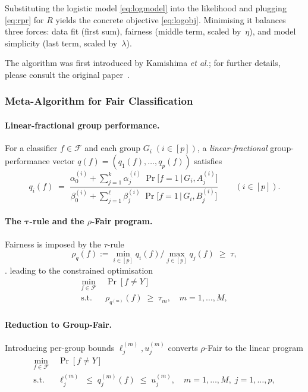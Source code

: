 \documentclass[12pt,a4paper,openright,twoside]{book}
\begin{document}
\noindent
Substituting the logistic model \eqref{eq:logmodel} into the likelihood and plugging \eqref{eq:rpr} for \(R\) yields the concrete objective \eqref{eq:logobj}.  Minimising it balances three forces: data fit (first sum), fairness (middle term, scaled by~\(\eta\)), and model simplicity (last term, scaled by~\(\lambda\)).

The algorithm was first introduced by Kamishima \emph{et al.}; for further details, please consult the original paper~\cite{kamishima2012prejudiceremoverregularizer}.

\subsubsection{Meta-Algorithm for Fair Classification}

\paragraph{Linear-fractional group performance.}
For a classifier $f\!\in\!\mathcal{F}$ and each group $G_i\;(i\!\in\![p])$, a \emph{linear-fractional} group-performance vector $q(f)=(q_1(f),\dots,q_p(f))$ satisfies \cite{celis2020classificationfairnessconstraintsmetaalgorithm}
\[
q_i(f)\;=\;
\frac{\displaystyle 
\alpha^{(i)}_0+\sum_{j=1}^{k}\alpha^{(i)}_j\;
      \Pr\!\bigl[f=1\,\bigl\vert\,G_i,A^{(i)}_{j}\bigr]}
     {\displaystyle
      \beta^{(i)}_0+\sum_{j=1}^{\ell}\beta^{(i)}_j\;
      \Pr\!\bigl[f=1\,\bigl\vert\,G_i,B^{(i)}_{j}\bigr]}
\qquad(i\in[p]).
\]

\paragraph{The $\boldsymbol{\tau}$-rule and the \texorpdfstring{$\rho$}{rho}-Fair program.}
Fairness is imposed by the $\tau$-rule
\[
\rho_q(f):=\min_{i\in[p]}q_i(f)/\max_{j\in[p]}q_j(f)\;\ge\;\tau,
\] \cite{celis2020classificationfairnessconstraintsmetaalgorithm}.
leading to the constrained optimisation
\[
\begin{aligned}
\min_{f\in\mathcal{F}}\;&\Pr[f\neq Y]\\
\text{s.t.}\;&\rho_{q^{(m)}}(f)\;\ge\;\tau_m,\quad m=1,\dots,M,
\end{aligned}
\tag{$\rho$-Fair} %
\]

\paragraph{Reduction to Group-Fair.}
Introducing per-group bounds $\ell_j^{(m)},u_j^{(m)}$ converts $\rho$-Fair to the linear program \cite{celis2020classificationfairnessconstraintsmetaalgorithm}
\[
\begin{aligned}
\min_{f\in\mathcal{F}}\;&\Pr[f\neq Y]\\
\text{s.t.}\;&\ell^{(m)}_j\;\le\;q^{(m)}_j(f)\;\le\;u^{(m)}_j,
\quad m=1,\dots,M,\;j=1,\dots,p,
\end{aligned}
\tag{Group-Fair}
\]
\end{document}
